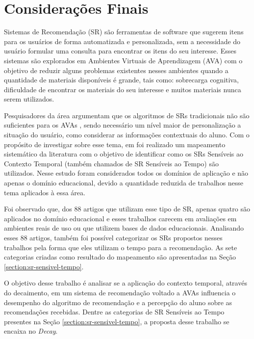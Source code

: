 \chapter{Considerações Finais}\label{chapter:conclusoes}

Sistemas de Recomendação (SR) são ferramentas de software que sugerem itens para os usuários de forma automatizada e personalizada,
sem a necessidade do usuário formular uma consulta para encontrar os itens do seu interesse. Esses sistemas são
explorados em Ambientes Virtuais de Aprendizagem (AVA) com o objetivo de reduzir alguns problemas existentes nesses ambientes
quando a quantidade de materiais disponíveis é grande, tais como: sobrecarga cognitiva, dificuldade de encontrar os materiais
do seu interesse e muitos materiais nunca serem utilizados.

Pesquisadores da área argumentam que os algoritmos de SRs tradicionais não são suficientes para os AVAs \cite{verbert2012context, drachsler2015panorama},
sendo necessário um nível maior de personalização a situação do usuário, como considerar as informações contextuais do aluno.
Com o propósito de investigar sobre esse tema, em  foi realizado um mapeamento sistemático da
literatura com o objetivo de identificar como os SRs Sensíveis ao Contexto Temporal (também chamados de SR Sensíveis ao
Tempo) são utilizados. Nesse estudo foram considerados todos os domínios de aplicação e não apenas o domínio educacional,
devido a quantidade reduzida de trabalhos nesse tema aplicados à essa área.

Foi observado que, dos 88 artigos que utilizam esse tipo de SR, apenas quatro são aplicados no domínio educacional e esses
trabalhos carecem em avaliações em ambientes reais de uso ou que utilizem bases de dados educacionais. Analisando esses
88 artigos, também foi possível categorizar os SRs propostos nesses trabalhos pela forma que eles utilizam o tempo para
a recomendação. As sete categorias criadas como resultado do mapeamento são apresentadas na Seção \ref{section:sr-sensivel-tempo}.

O objetivo desse trabalho é analisar se a aplicação do contexto temporal, através do decaimento, em um sistema de recomendação
voltado a AVAs influencia o desempenho do algoritmo de recomendação e a percepção do aluno sobre as recomendações
recebidas. Dentre as categorias de SR Sensíveis ao Tempo presentes na Seção \ref{section:sr-sensivel-tempo}, a proposta
desse trabalho se encaixa no \textit{Decay}.

